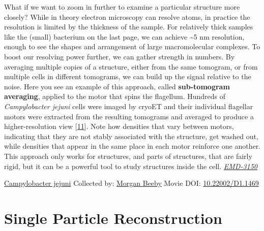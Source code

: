 \documentclass[]{tufte-book}
\begin{document}
What if we want to zoom in further to examine a particular structure more closely? While in theory electron microscopy can resolve atoms, in practice the resolution is limited by the thickness of the sample. For relatively thick samples like the (small) bacterium on the last page, we can achieve \textasciitilde{}5 nm resolution, enough to see the shapes and arrangement of large macromolecular complexes. To boost our resolving power further, we can gather strength in numbers. By averaging multiple copies of a structure, either from the same tomogram, or from multiple cells in different tomograms, we can build up the signal relative to the noise. Here you see an example of this approach, called \textbf{sub-tomogram averaging}, applied to the motor that spins the flagellum. Hundreds of \emph{Campylobacter jejuni} cells were imaged by cryoET and their individual flagellar motors were extracted from the resulting tomograms and averaged to produce a higher-resolution view {[}\protect\hyperlink{ref-beeby2016}{11}{]}. Note how densities that vary between motors, indicating that they are not stably associated with the structure, get washed out, while densities that appear in the same place in each motor reinforce one another. This approach only works for structures, and parts of structures, that are fairly rigid, but it can be a powerful tool to study structures inside the cell. \href{https://www.ebi.ac.uk/pdbe/entry/emdb/emd-3150}{\emph{EMD-3150}}



\hypertarget{htmlwidget-95536d6e90f948058048}{}

\label{fig:1-7}\protect\hyperlink{tree}{Campylobacter jejuni} Collected by: \protect\hyperlink{morgan_beeby}{Morgan Beeby} Movie DOI: \href{https://doi.org/10.22002/D1.1469}{10.22002/D1.1469}

\hypertarget{single-particle-reconstruction}{%
\section{Single Particle Reconstruction}\label{single-particle-reconstruction}}
\end{document}
